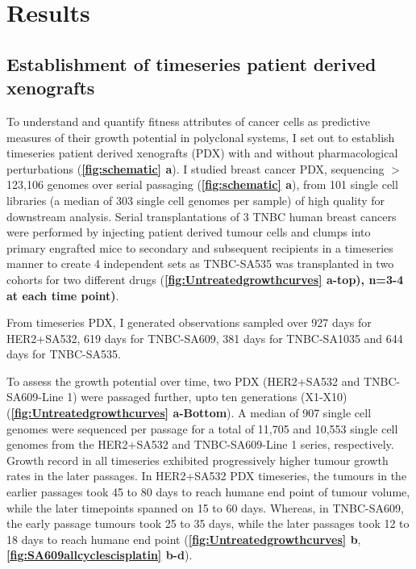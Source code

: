 \section{Results}

\subsection{Establishment of timeseries patient derived xenografts}

To understand and quantify fitness attributes of cancer cells as  predictive measures of their growth potential in polyclonal systems, I set out to establish timeseries patient derived xenografts (PDX) with and without pharmacological perturbations (\textbf{\autoref{fig:schematic} a}). I studied breast cancer PDX, sequencing $>$123,106 genomes over serial passaging (\textbf{\autoref{fig:schematic} a}), from 101 single cell libraries (a median of 303 single cell genomes per sample) of high quality for downstream analysis. 
Serial transplantations of 3 TNBC human breast cancers were performed by injecting patient derived tumour cells and clumps into primary engrafted mice to secondary and subsequent recipients in a timeseries manner to create 4 independent sets as TNBC-SA535 was transplanted in two cohorts for two different drugs (\textbf{\autoref{fig:Untreatedgrowthcurves} a-top), n=3-4 at each time point)}. 

From timeseries PDX, I generated observations sampled over 927 days for HER2+SA532, 619 days for TNBC-SA609, 381 days for TNBC-SA1035 and 644 days for TNBC-SA535. 

To assess the growth potential over time, two PDX (HER2+SA532 and TNBC-SA609-Line 1) were passaged further, upto ten generations (X1-X10)
 (\textbf{\autoref{fig:Untreatedgrowthcurves} a-Bottom}).
 A median of 907 single cell genomes were sequenced per passage for a total of 11,705 and 10,553 single cell genomes from the HER2+SA532 and TNBC-SA609-Line 1 series, respectively. 
Growth record in all timeseries exhibited progressively higher tumour growth rates in the later passages. In HER2+SA532 PDX timeseries, the tumours in the earlier passages took 45 to 80 days to reach humane end point of tumour volume, while the later timepoints spanned on 15 to 60 days. Whereas, in TNBC-SA609, the early passage tumours took 25 to 35 days, while the later passages took 12 to 18 days to reach humane end point (\textbf{\autoref{fig:Untreatedgrowthcurves} b}, \textbf{\autoref{fig:SA609allcyclescisplatin} b-d}).

